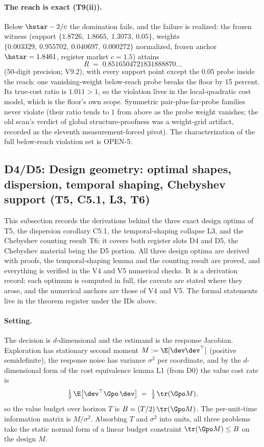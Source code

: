 \paragraph{The reach is exact (T9(ii)).}
Below $\hstar-2/c$ the domination fails, and the failure is realized: the
frozen witness (support $\{1.8726,\allowbreak\ 1.8665,\allowbreak\ 1.3073,\allowbreak\ 0.05\}$, weights
$\{0.003329,\allowbreak\ 0.955702,\allowbreak\ 0.040697,\allowbreak\ 0.000272\}$ normalized, frozen anchor
$\hstar=1.8461$, register market $c=1.5$) attains
\begin{equation*}
R \;=\; 0.8516504721831888870\ldots
\end{equation*}
(50-digit precision; V9.2), with every support point except the $0.05$
probe inside the reach: one vanishing-weight below-reach probe breaks the
floor by 15 percent. Its true-cost ratio is $1.011>1$, so the violation
lives in the local-quadratic cost model, which is the floor's own scope.
Symmetric pair-plus-far-probe families never violate (their ratio tends to
$1$ from above as the probe weight vanishes; the old scan's verdict of
global structure-proofness was a weight-grid artifact, recorded as the
eleventh measurement-forced pivot). The characterization of the full
below-reach violation set is OPEN-5.

\subsection*{D4/D5: Design geometry: optimal shapes, dispersion, temporal shaping, Chebyshev support (T5, C5.1, L3, T6)}

This subsection records the derivations behind the three exact design optima
of T5, the dispersion corollary C5.1, the temporal-shaping collapse L3, and
the Chebyshev counting result T6; it covers both register slots D4 and D5,
the Chebyshev material being the D5 portion. All three design optima are
derived with proofs, the temporal-shaping lemma and the counting result are
proved, and everything is verified in the V4 and V5 numerical checks. It is
a derivation record: each optimum is computed in full, the caveats are
stated where they arose, and the numerical anchors are those of V4 and V5.
The formal statements live in the theorem register under the IDs above.

\paragraph{Setting.}
The decision is $d$-dimensional and the estimand is the response Jacobian.
Exploration has stationary second moment $M := \E[\dev\dev^\top]$ (positive
semidefinite), the response noise has variance $\sigma^2$ per coordinate,
and by the $d$-dimensional form of the cost equivalence lemma L1 (from D0)
the value cost rate is
\begin{equation*}
\tfrac{1}{2}\,\E\big[\dev^\top \Gpo\, \dev\big]
\;=\; \tfrac{1}{2}\,\tr(\Gpo M),
\end{equation*}
so the value budget over horizon $T$ is $B = (T/2)\,\tr(\Gpo M)$. The
per-unit-time information matrix is $M/\sigma^2$. Absorbing $T$ and
$\sigma^2$ into units, all three problems take the static normal form of a
linear budget constraint $\tr(\Gpo M) \le B$ on the design $M$.

